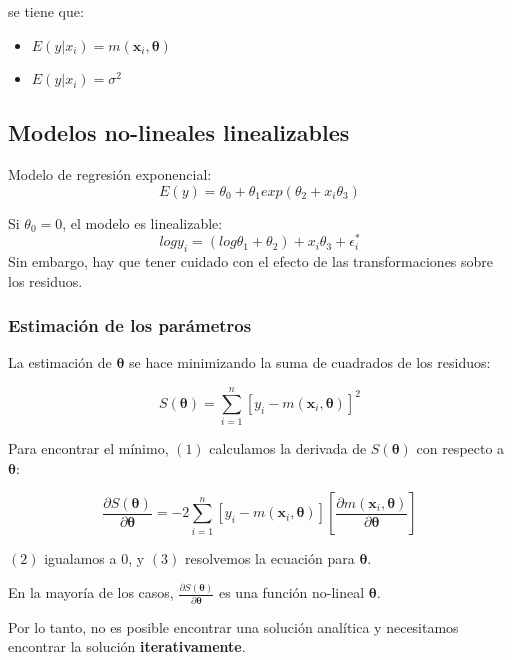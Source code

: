 \documentclass[
]{article}
\providecommand{\tightlist}{%
  \setlength{\itemsep}{0pt}\setlength{\parskip}{0pt}}
\begin{document}
se tiene que:

\begin{itemize}
\tightlist
\item
  \(E(y|x_{i})=m(\boldsymbol x_{i},\boldsymbol \theta)\)
\item
  \(E(y|x_{i})=\sigma^2\)
\end{itemize}

\hypertarget{modelos-no-lineales-linealizables}{%
\subsection{Modelos no-lineales linealizables}\label{modelos-no-lineales-linealizables}}

Modelo de regresión exponencial:
\[
E(y)=\theta_{0}+\theta_{1}exp(\theta_{2}+x_{i}\theta_{3})
\]

Si \(\theta_{0}=0\), el modelo es linealizable:
\[
logy_{i}=(log\theta_{1}+\theta_{2})+x_{i}\theta_{3}+\epsilon_{i}^*
\]
Sin embargo, hay que tener cuidado con el efecto de las
transformaciones sobre los residuos.

\hypertarget{estimaciuxf3n-de-los-paruxe1metros}{%
\subsubsection{Estimación de los parámetros}\label{estimaciuxf3n-de-los-paruxe1metros}}

La estimación de \(\boldsymbol \theta\) se hace minimizando la suma de cuadrados de
los residuos:

\[
S(\boldsymbol \theta)=\sum_{i=1}^n[y_{i}-m(\boldsymbol x_{i},\boldsymbol \theta)]^2
\]

Para encontrar el mínimo, \((1)\) calculamos la derivada de \(S(\boldsymbol \theta)\) con respecto a \(\boldsymbol \theta\):

\[
\frac{\partial S(\boldsymbol \theta)}{\partial\boldsymbol \theta}=-2\sum_{i=1}^n[y_{i}-m(\boldsymbol x_{i},\boldsymbol \theta)][\frac{\partial m(\boldsymbol x_{i},\boldsymbol \theta)}{\partial\boldsymbol \theta}]
\]

\((2)\) igualamos a \(0\), y \((3)\) resolvemos la ecuación para \(\boldsymbol \theta\).

En la mayoría de los casos, \(\frac{\partial S(\boldsymbol \theta)}{\partial\boldsymbol \theta}\) es una función no-lineal \(\boldsymbol \theta\).

Por lo tanto, no es posible encontrar una solución analítica y
necesitamos encontrar la solución \textbf{iterativamente}.
\end{document}
